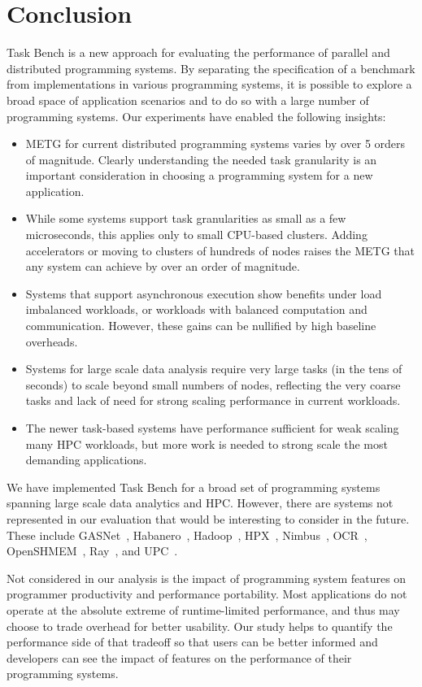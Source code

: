 \section{Conclusion}
\label{sec:conclusion}

Task Bench is a new approach for evaluating the performance of
parallel and distributed programming systems. By separating the
specification of a benchmark from implementations in various
programming systems, it is possible to explore a broad space of
application scenarios and to do so with a large number of programming
systems. Our experiments have enabled the following
insights:

\begin{itemize}

\item METG for current distributed programming systems varies by over
  5 orders of magnitude.  Clearly understanding the needed task
  granularity is an important consideration in choosing a programming
  system for a new application.

\item While some systems support task granularities as small as a few
  microseconds, this applies only to small CPU-based clusters. Adding
  accelerators or moving to clusters of hundreds of nodes raises the
  METG that any system can achieve by over an order of magnitude.

\item Systems that support asynchronous execution show benefits under
  load imbalanced workloads, or workloads with balanced computation
  and communication. However, these gains can be nullified by
  high baseline overheads.

\item Systems for large scale data analysis require very large tasks
  (in the tens of seconds) to scale beyond small numbers of nodes,
  reflecting the very coarse tasks and lack of need for strong scaling
  performance in current workloads.

\item The newer task-based systems have performance sufficient for
  weak scaling many HPC workloads, but more work is needed to strong
  scale the most demanding applications.

\end{itemize}

We have implemented Task Bench for a broad set of programming systems
spanning large scale data analytics and HPC. However, there are
systems not represented in our evaluation that would be interesting to
consider in the future. These include GASNet~\cite{GASNET07},
Habanero~\cite{Habanero11}, Hadoop~\cite{Hadoop},
HPX~\cite{Kaiser2014}, Nimbus~\cite{Nimbus17}, OCR~\cite{OCR14},
OpenSHMEM~\cite{OpenSHMEM10}, Ray~\cite{Ray18}, and UPC~\cite{UPC99}.

Not considered in our analysis is the impact of programming system
features on programmer productivity and performance portability. Most
applications do not operate at the absolute extreme of runtime-limited
performance, and thus may choose to trade overhead for better
usability. Our study helps to quantify the performance side of that
tradeoff so that users can be better informed and developers can see
the impact of features on the performance of their programming
systems.
